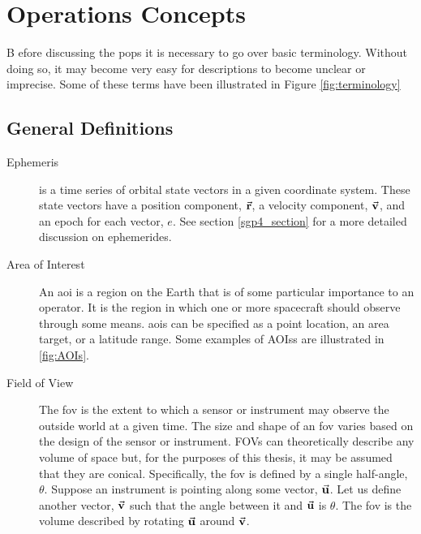 \glsresetall{} 
\chapter{Operations Concepts}

\lettrine[lines=2, findent=0pt, nindent=5pt]{B}{} efore discussing the
\gls{pops} it is necessary to go over basic terminology. Without doing so, it
may become very easy for descriptions to become unclear or imprecise. Some of
these terms have been illustrated in Figure \ref{fig:terminology}

\section{General Definitions}

\begin{description} 

    \item[Ephemeris] is a time series of orbital state vectors in a given
	coordinate system. These state vectors have a position component,
	$\vec{\bm{\mathrm{r}}}$, a velocity component, $\vec{\bm{\mathrm{v}}}$, and an epoch for each
	vector, $e$. See section \ref{sgp4_section} for a more detailed
	discussion on ephemerides.

    \item[Area of Interest] An \gls{aoi} is a region on the Earth that is of
	some particular importance to an operator. It is the region in which
	one or more spacecraft should observe through some means. \glspl{aoi}
	can be specified as a point location, an area target, or a latitude
	range. Some examples of \glspl{AOIs} are illustrated in \ref{fig:AOIs}.

    \item[Field of View] The \gls{fov} is the extent to which a sensor or
	instrument may observe the outside world at a given time. The size and
	shape of an \gls{fov} varies based on the design of the sensor or
	instrument. \glspl{FOV} can theoretically describe any volume of space
	but, for the purposes of this thesis, it may be assumed that they are
	conical. Specifically, the \gls{fov} is defined by a single half-angle,
	$\theta$. Suppose an instrument is pointing along some vector,
	$\vec{\bm{\mathrm{u}}}$. Let us define another vector, $\vec{\bm{\mathrm{v}}}$ such that the angle
	between it and $\vec{\bm{\mathrm{u}}}$ is $\theta$. The \gls{fov} is the volume
	described by rotating $\vec{\bm{\mathrm{u}}}$ around $\vec{\bm{\mathrm{v}}}$.



\end{description}
